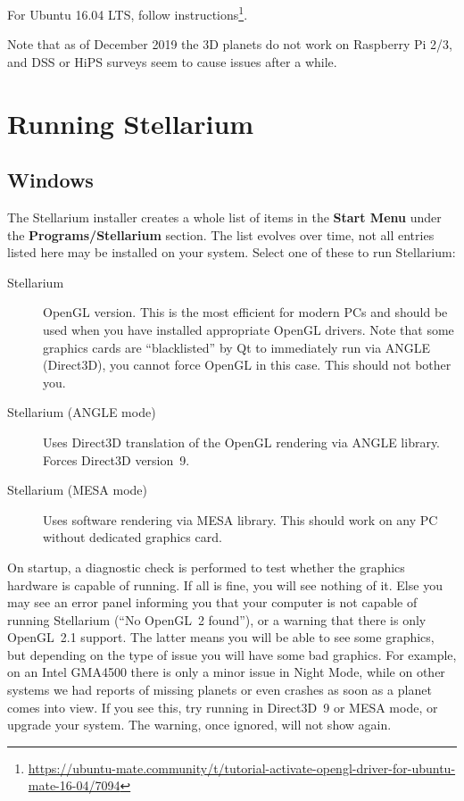 For Ubuntu 16.04 LTS, follow instructions\footnote{\url{https://ubuntu-mate.community/t/tutorial-activate-opengl-driver-for-ubuntu-mate-16-04/7094}}. 
	
Note that as of December 2019 the 3D planets do not work on Raspberry Pi 2/3, and DSS or HiPS surveys seem to cause issues after a while.
	

\section{Running Stellarium}
\label{sec:GettingStarted:Running}

\subsection{Windows}
\label{sec:GettingStarted:Running:Windows}

The Stellarium installer creates a whole list of items in the
\textbf{Start Menu} under the \textbf{Programs/Stellarium}
section. The list evolves over time, not all entries listed here 
may be installed on your system. Select one of these to run Stellarium:
\begin{description}
\item[Stellarium] OpenGL version. This is the most efficient for
  modern PCs and should be used when you have installed appropriate
  OpenGL drivers. Note that some graphics cards are ``blacklisted'' by
  Qt to immediately run via ANGLE (Direct3D), you cannot force OpenGL in this
  case. This should not bother you.
\item[Stellarium (ANGLE mode)] Uses Direct3D translation of the OpenGL
  rendering via ANGLE library.  Forces Direct3D version~9.
\item[Stellarium (MESA mode)] Uses software rendering via MESA
  library. This should work on any PC without dedicated graphics card.
\end{description}
On startup, a diagnostic check is performed to test whether the
graphics hardware is capable of running. If all is fine, you will see
nothing of it.  Else you may see an error panel informing you that
your computer is not capable of running Stellarium (``No OpenGL~2
found''), or a warning that there is only OpenGL~2.1 support. The
latter means you will be able to see some graphics, but depending on
the type of issue you will have some bad graphics. For example, on an
Intel GMA4500 there is only a minor issue in Night Mode, while on
other systems we had reports of missing planets or even crashes as
soon as a planet comes into view. If you see this, try running in
Direct3D~9 or MESA mode, or upgrade your system. The warning, once
ignored, will not show again.

